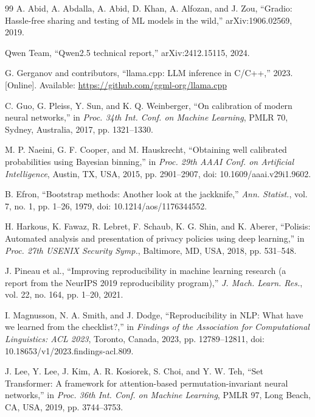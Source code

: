 \documentclass[11pt,a4paper]{article}
\begin{document}
\begin{thebibliography}{99}
 A. Abid, A. Abdalla, A. Abid, D. Khan, A. Alfozan, and J. Zou, ``Gradio: Hassle-free sharing and testing of ML models in the wild,'' arXiv:1906.02569, 2019.

 Qwen Team, ``Qwen2.5 technical report,'' arXiv:2412.15115, 2024.

 G. Gerganov and contributors, ``llama.cpp: LLM inference in C/C++,'' 2023. [Online]. Available: \url{https://github.com/ggml-org/llama.cpp}

 C. Guo, G. Pleiss, Y. Sun, and K. Q. Weinberger, ``On calibration of modern neural networks,'' in \emph{Proc. 34th Int. Conf. on Machine Learning}, PMLR 70, Sydney, Australia, 2017, pp. 1321–1330.

 M. P. Naeini, G. F. Cooper, and M. Hauskrecht, ``Obtaining well calibrated probabilities using Bayesian binning,'' in \emph{Proc. 29th AAAI Conf. on Artificial Intelligence}, Austin, TX, USA, 2015, pp. 2901–2907, doi: 10.1609/aaai.v29i1.9602.

 B. Efron, ``Bootstrap methods: Another look at the jackknife,'' \emph{Ann. Statist.}, vol. 7, no. 1, pp. 1–26, 1979, doi: 10.1214/aos/1176344552.

 H. Harkous, K. Fawaz, R. Lebret, F. Schaub, K. G. Shin, and K. Aberer, ``Polisis: Automated analysis and presentation of privacy policies using deep learning,'' in \emph{Proc. 27th USENIX Security Symp.}, Baltimore, MD, USA, 2018, pp. 531–548.

 J. Pineau et al., ``Improving reproducibility in machine learning research (a report from the NeurIPS 2019 reproducibility program),'' \emph{J. Mach. Learn. Res.}, vol. 22, no. 164, pp. 1–20, 2021.

 I. Magnusson, N. A. Smith, and J. Dodge, ``Reproducibility in NLP: What have we learned from the checklist?,'' in \emph{Findings of the Association for Computational Linguistics: ACL 2023}, Toronto, Canada, 2023, pp. 12789–12811, doi: 10.18653/v1/2023.findings-acl.809.

 J. Lee, Y. Lee, J. Kim, A. R. Kosiorek, S. Choi, and Y. W. Teh, ``Set Transformer: A framework for attention-based permutation-invariant neural networks,'' in \emph{Proc. 36th Int. Conf. on Machine Learning}, PMLR 97, Long Beach, CA, USA, 2019, pp. 3744–3753.

\end{thebibliography}

\clearpage
\end{document}
